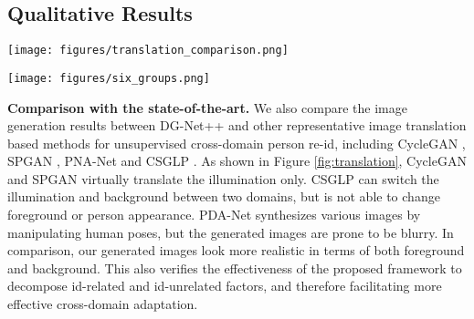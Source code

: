 \documentclass[runningheads]{llncs}
\begin{document}
\subsection{Qualitative Results}

\begin{figure*}[!t]
	\centering
    \texttt{[image: figures/translation\_comparison.png]}
    \caption{Comparison of the generated images across two cross-domains between Market and Duke of different methods including CycleGAN \cite{zhu2017unpaired}, SPGAN \cite{deng2018image}, PNA-Net \cite{li2019cross}, CSGLP \cite{ren2019domain}, and our approach DG-Net++.  Please attention to both foreground and background of the synthetic images.}
    \vspace{-10pt}
    \label{fig:translation}
\end{figure*}

\begin{figure*}[!h]
	\centering
	\texttt{[image: figures/six\_groups.png]}
\caption{Examples of our synthesized images on six cross-domain benchmark pairs. We  show source images in the first row, target images in the second row, synthetic images with source appearance and target structure in the third row, and synthetic images with target appearance and source structure in the fourth row.}
    \vspace{-4pt}
	\label{fig:six_groups}
\end{figure*}

\noindent\textbf{Comparison with the state-of-the-art.} We also compare the image generation results between DG-Net++ and other representative image translation based methods for unsupervised cross-domain person re-id, including CycleGAN \cite{zhu2017unpaired}, SPGAN \cite{wei2018person}, PNA-Net \cite{li2019cross} and CSGLP \cite{ren2019domain}. As shown in Figure \ref{fig:translation}, CycleGAN and SPGAN virtually translate the illumination only. CSGLP can switch the illumination and background between two domains, but is not able to change foreground or person appearance. PDA-Net synthesizes various images by manipulating human poses, but the generated images are prone to be blurry. In comparison, our generated images look more realistic in terms of both foreground and background. This also verifies the effectiveness of the proposed framework to decompose id-related and id-unrelated factors, and therefore facilitating more effective cross-domain adaptation.
\end{document}
